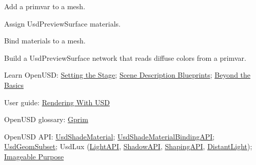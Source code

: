 
\begin{Objectives}
  \item Add a primvar to a mesh.
  \item Assign UsdPreviewSurface materials.
  \item Bind materials to a mesh.
  \item Build a UsdPreviewSurface network that reads diffuse colors from a primvar.
\end{Objectives}

\begin{Resources}
  \item Learn OpenUSD: \href{https://docs.nvidia.com/learn-openusd/latest/stage-setting/index.html}{Setting the Stage};
        \href{https://docs.nvidia.com/learn-openusd/latest/scene-description-blueprints/index.html}{Scene Description Blueprints};
        \href{https://docs.nvidia.com/learn-openusd/latest/beyond-basics/index.html}{Beyond the Basics}
  \item User guide: \href{https://openusd.org/release/user_guides/render_user_guide.html}{Rendering With USD}
  \item OpenUSD glossary: \href{https://openusd.org/release/glossary.html#usdglossary-gprim}{Gprim}
  \item OpenUSD API: \href{https://openusd.org/release/api/class_usd_shade_material.html}{UsdShadeMaterial};
        \href{https://openusd.org/release/api/class_usd_shade_material_binding_a_p_i.html}{UsdShadeMaterialBindingAPI};
        \href{https://openusd.org/release/api/class_usd_geom_subset.html}{UsdGeomSubset};
        UsdLux (\href{https://openusd.org/release/api/class_usd_lux_light_a_p_i.html}{LightAPI},
        \href{https://openusd.org/release/api/class_usd_lux_shadow_a_p_i.html}{ShadowAPI},
        \href{https://openusd.org/release/api/class_usd_lux_shaping_a_p_i.html}{ShapingAPI},
        \href{https://openusd.org/release/api/class_usd_lux_distant_light.html}{DistantLight});
        \href{https://openusd.org/release/api/usd_geom_page_front.html#UsdGeom_ImageablePurpose}{Imageable Purpose}
\end{Resources}

